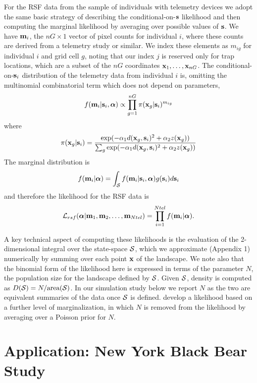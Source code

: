 \documentclass[12pt]{article}
\begin{document}
For the RSF data from the sample of individuals with telemetry devices
we adopt the same basic strategy of describing the
conditional-on-${\bf s}$ likelihood and then computing the marginal
likelihood by averaging over possible values of ${\bf s}$.
We have ${\bf m}_{i}$, %
the $nG \times 1$ vector of pixel counts for individual $i$,
where these counts are derived from a telemetry study or similar. We
index these elements as $m_{ig}$ for individual $i$ and grid cell $g$,
noting that our index $j$ is reserved only for trap locations, which
are a subset of the $nG$ coordinates ${\bf x}_{1},\ldots, {\bf x}_{nG}$.
The conditional-on-${\bf s}_{i}$ distribution of the telemetry data
from individual $i$ is, omitting the multinomial combinatorial term which does not
depend on parameters,
\[
 f({\bf m}_{i}  | {\bf s}_{i}, {\bm \alpha} ) \propto
\prod_{g=1}^{nG}  \pi({\bf x}_{g}| {\bf s}_{i})^{m_{ig}}
\]
where
\[
 \pi({\bf x}_{g}|{\bf s}_{i})  = \frac{ \exp( -\alpha_{1}
d({\bf x}_{g},{\bf s}_{i})^{2}
 +\alpha_{2} z({\bf x}_{g}) ) }
{ \sum_{g} \exp(-\alpha_{1}
d({\bf x}_{g},{\bf s}_{i})^{2}
+\alpha_{2} z({\bf x}_{g}))}
\]
The marginal distribution is
\[
f({\bf m}_{i}|{\bm \alpha}) =    \int_{{\cal S}}  f({\bf m}_{i} |{\bf s}_{i},{\bm \alpha}) g({\bf s}_{i}) d{\bf s}_{i}
\]
and therefore the likelihood for the RSF data is
\[
{\cal L}_{rsf}({\bm \alpha} | {\bf m}_{1},{\bf m}_{2},\ldots, {\bf m}_{Ntel}) = \prod_{i=1}^{Ntel}
f({\bf m}_{i}|{\bm \alpha}).
\]

A key technical aspect of computing these likelihoods is the
evaluation of the 2-dimensional integral over the state-space ${\cal
  S}$, which we approximate (Appendix 1) numerically by summing over
each point ${\bf x}$ of the landscape.
We note also that the binomial form of the likelihood here is
expressed in terms of the parameter
$N$, the population size for the landscape defined by ${\cal
  S}$. Given ${\cal S}$, density is computed as $D({\cal S}) =
N/\mbox{area}({\cal S})$. In our simulation study below we report $N$ as the
two are equivalent summaries of the data once ${\cal S}$ is
defined. \citet{borchers_efford:2008} develop a likelihood based on a
further level of marginalization, in which $N$ is removed from the
likelihood by averaging over a  Poisson prior for $N$.

\section{Application: New York Black Bear Study}
\label{sec.nybears}
\end{document}
